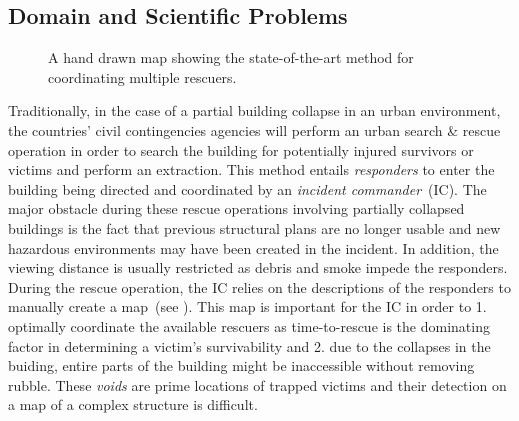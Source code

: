 
\subsection{Domain and Scientific Problems} \label{contributions:usar:background}
\begin{figure}
\centering
{}
\caption{A hand drawn map showing the state-of-the-art method for coordinating multiple rescuers.}
\label{contributions:usar:map:hand}
\end{figure}

Traditionally, in the case of a partial building collapse in an urban environment, the countries' civil contingencies agencies will perform an urban search \& rescue operation in order to search the building for potentially injured survivors or victims and perform an extraction.  This method entails \emph{responders} to enter the building being directed and coordinated by an \emph{incident commander}~(IC).  The major obstacle during these rescue operations involving partially collapsed buildings is the fact that previous structural plans are no longer usable and new hazardous environments may have been created in the incident.  In addition, the viewing distance is usually restricted as debris and smoke impede the responders.  During the rescue operation, the IC relies on the descriptions of the responders to manually create a map~(see ).  This map is important for the IC in order to 1. optimally coordinate the available rescuers as time-to-rescue is the dominating factor in determining a victim's survivability and 2. due to the collapses in the buiding, entire parts of the building might be inaccessible without removing rubble.  These \emph{voids} are prime locations of trapped victims and their detection on a  map of a complex  structure is difficult.

